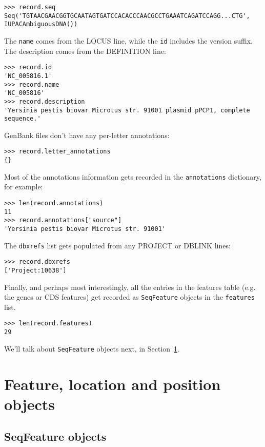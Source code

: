 \begin{verbatim}
>>> record.seq
Seq('TGTAACGAACGGTGCAATAGTGATCCACACCCAACGCCTGAAATCAGATCCAGG...CTG', IUPACAmbiguousDNA())
\end{verbatim}

The \verb|name| comes from the LOCUS line, while the \verb|id| includes the version suffix.
The description comes from the DEFINITION line:

\begin{verbatim}
>>> record.id
'NC_005816.1'
>>> record.name
'NC_005816'
>>> record.description
'Yersinia pestis biovar Microtus str. 91001 plasmid pPCP1, complete sequence.'
\end{verbatim}

GenBank files don't have any per-letter annotations:

\begin{verbatim}
>>> record.letter_annotations
{}
\end{verbatim}

Most of the annotations information gets recorded in the \verb|annotations| dictionary, for example:

\begin{verbatim}
>>> len(record.annotations)
11
>>> record.annotations["source"]
'Yersinia pestis biovar Microtus str. 91001'
\end{verbatim}

The \verb|dbxrefs| list gets populated from any PROJECT or DBLINK lines:

\begin{verbatim}
>>> record.dbxrefs
['Project:10638']
\end{verbatim}

Finally, and perhaps most interestingly, all the entries in the features table (e.g. the genes or CDS features) get recorded as \verb|SeqFeature| objects in the \verb|features| list.

\begin{verbatim}
>>> len(record.features)
29
\end{verbatim}

\noindent We'll talk about \verb|SeqFeature| objects next, in
Section~\ref{sec:seq_features}.

\section{Feature, location and position objects}
\label{sec:seq_features}

\subsection{SeqFeature objects}


